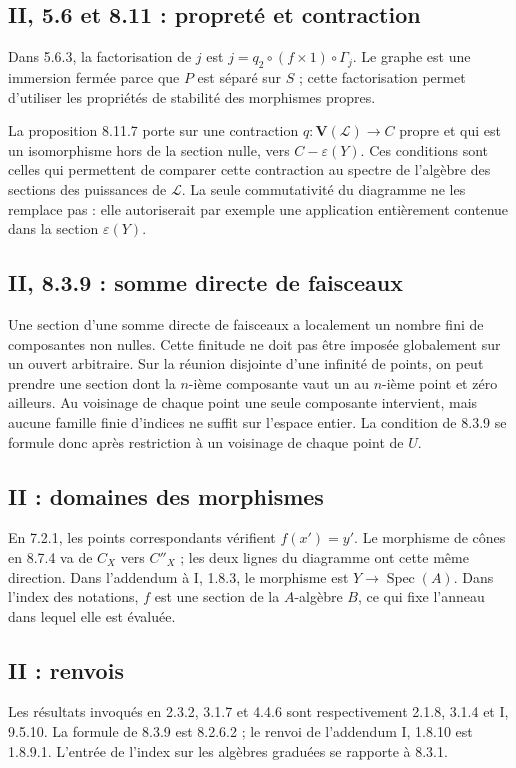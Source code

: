 \subsection{II, 5.6 et 8.11 : propreté et contraction}
\label{note:base2-proper}
Dans 5.6.3, la factorisation de $j$ est
$j=q_2\circ(f\times1)\circ\Gamma_j$.
Le graphe est une immersion fermée parce que $P$ est séparé sur
$S$ ; cette factorisation permet d'utiliser les propriétés de
stabilité des morphismes propres.

La proposition 8.11.7 porte sur une contraction
$q:\mathbf V(\mathcal L)\to C$ propre et qui est un isomorphisme
hors de la section nulle, vers $C-\varepsilon(Y)$.
Ces conditions sont celles qui permettent de comparer cette
contraction au spectre de l'algèbre des sections des puissances
de $\mathcal L$. La seule commutativité du diagramme ne les
remplace pas : elle autoriserait par exemple une application
entièrement contenue dans la section $\varepsilon(Y)$.

\subsection{II, 8.3.9 : somme directe de faisceaux}
\label{note:base2-sheafsum}
Une section d'une somme directe de faisceaux a localement un
nombre fini de composantes non nulles. Cette finitude ne doit
pas être imposée globalement sur un ouvert arbitraire.
Sur la réunion disjointe d'une infinité de points, on peut
prendre une section dont la $n$-ième composante vaut un au
$n$-ième point et zéro ailleurs. Au voisinage de chaque point
une seule composante intervient, mais aucune famille finie
d'indices ne suffit sur l'espace entier.
La condition de 8.3.9 se formule donc après restriction à un
voisinage de chaque point de $U$.

\subsection{II : domaines des morphismes}
\label{note:base2-domains}
En 7.2.1, les points correspondants vérifient $f(x')=y'$.
Le morphisme de cônes en 8.7.4 va de $C_X$ vers $C''_X$ ;
les deux lignes du diagramme ont cette même direction.
Dans l'addendum à I, 1.8.3, le morphisme est
$Y\to\operatorname{Spec}(A)$. Dans l'index des notations,
$f$ est une section de la $A$-algèbre $B$, ce qui fixe
l'anneau dans lequel elle est évaluée.

\subsection{II : renvois}
\label{note:base2-refs}
Les résultats invoqués en 2.3.2, 3.1.7 et 4.4.6 sont
respectivement 2.1.8, 3.1.4 et I, 9.5.10.
La formule de 8.3.9 est 8.2.6.2 ; le renvoi de l'addendum
I, 1.8.10 est 1.8.9.1. L'entrée de l'index sur les algèbres
graduées se rapporte à 8.3.1.
\par

